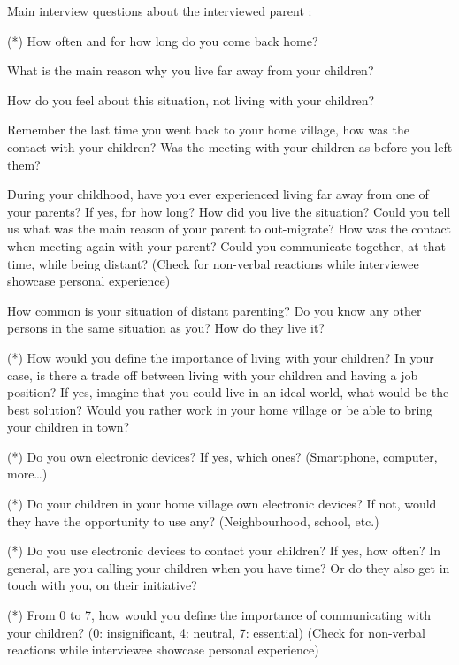 Main interview questions about the interviewed parent :

\begin{todolist}
    \item (*) How often and for how long do you come back home? 
    \item What is the main reason why you live far away from your children?
    \item How do you feel about this situation, not living with your children?
    \item Remember the last time you went back to your home village, how was the contact with your children? Was the meeting with your children as before you left them?
    \item During your childhood, have you ever experienced living far away from one of your parents? If yes, for how long? How did you live the situation? Could you tell us what was the main reason of your parent to out-migrate? How was the contact when meeting again with your parent? Could you communicate together, at that time, while being distant? (Check for non-verbal reactions while interviewee showcase personal experience)
    \item How common is your situation of distant parenting? Do you know any other persons in the same situation as you? How do they live it?
    \item (*) How would you define the importance of living with your children? In your case, is there a trade off between living with your children and having a job position? If yes, imagine that you could live in an ideal world, what would be the best solution? Would you rather work in your home village or be able to bring your children in town?
    \item (*) Do you own electronic devices? If yes, which ones? (Smartphone, computer, more…)
    \item (*) Do your children in your home village own electronic devices? If not, would they have the opportunity to use any? (Neighbourhood, school, etc.)
    \item (*) Do you use electronic devices to contact your children? If yes, how often? In general, are you calling your children when you have time? Or do they also get in touch with you, on their initiative?
    \item (*) From 0 to 7, how would you define the importance of communicating with your children? (0: insignificant, 4: neutral, 7: essential) (Check for non-verbal reactions while interviewee showcase personal experience)
\end{todolist}

